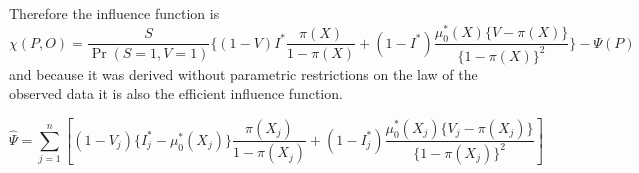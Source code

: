 \documentclass{article}
\begin{document}
Therefore the influence function is
\begin{equation*}
    \chi(P, O) = \dfrac{S}{\Pr(S=1, V=1)}  \bigg\{(1 - V) I^*\dfrac{\pi(X)}{1 - \pi(X)} + (1 - I^*)\dfrac{\mu^*_0(X)\{V - \pi(X)\}}{\{1 - \pi(X)\}^2}  \bigg\}  - \Psi(P) 
\end{equation*}
and because it was derived without parametric restrictions on the law of the observed data it is also the efficient influence function. 

\begin{equation*}
    \widehat{\Psi} = \sum_{j=1}^n \left[(1 - V_j) \{I^*_j - \mu^*_0(X_j)\}\dfrac{\pi(X_j)}{1 - \pi(X_j)} + (1 - I^*_j)\dfrac{\mu^*_0(X_j)\{V_j - \pi(X_j)\}}{\{1 - \pi(X_j)\}^2}\right]
\end{equation*}
\end{document}
